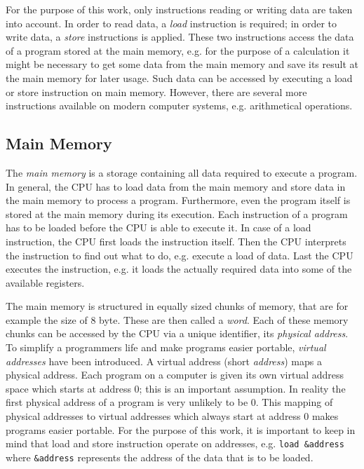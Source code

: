\documentclass[onecolumn, openright, master, english, signatures]{dbrgrptt}
\begin{document}
For the purpose of this work, only instructions reading or writing data are taken into account.
In order to read data, a \emph{load} instruction is required; in order to write data, a \emph{store} instructions is applied.
These two instructions access the data of a program stored at the main memory, e.g. for the purpose of a calculation it might be necessary to get some data from the main memory and save its result at the main memory for later usage.
Such data can be accessed by executing a load or store instruction on main memory.
However, there are several more instructions available on modern computer systems, e.g. arithmetical operations.

\subsection{Main Memory}
The \emph{main memory} is a storage containing all data required to execute a program.
In general, the \ac{CPU} has to load data from the main memory and store data in the main memory to process a program.
Furthermore, even the program itself is stored at the main memory during its execution.
Each instruction of a program has to be loaded before the \ac{CPU} is able to execute it.
In case of a load instruction, the \ac{CPU} first loads the instruction itself.
Then the CPU interprets the instruction to find out what to do, e.g. execute a load of data.
Last the \ac{CPU} executes the instruction, e.g. it loads the actually required data into some of the available registers.

The main memory is structured in equally sized chunks of memory, that are for example the size of 8 byte.
These are then called a \emph{word}.
Each of these memory chunks can be accessed by the \ac{CPU} via a unique identifier, its \emph{physical address}.
To simplify a programmers life and make programs easier portable, \emph{virtual addresses} have been introduced.
A virtual address (short \emph{address}) maps a physical address.
Each program on a computer is given its own virtual address space which starts at address 0; this is an important assumption.
In reality the first physical address of a program is very unlikely to be 0.
This mapping of physical addresses to virtual addresses which always start at address 0 makes programs easier portable.
For the purpose of this work, it is important to keep in mind that load and store instruction operate on addresses, e.g. \texttt{load \&address} where \texttt{\&address} represents the address of the data that is to be loaded.
\end{document}
